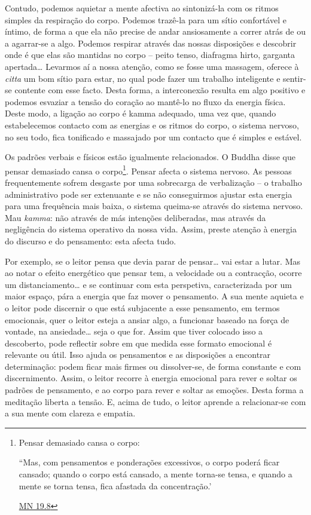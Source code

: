 Contudo, podemos aquietar a mente afectiva ao sintonizá-la com os ritmos simples da respiração do corpo. Podemos trazê-la para um sítio confortável e íntimo, de forma a que ela não precise de andar ansiosamente a correr atrás de ou a agarrar-se a algo. Podemos respirar através das nossas disposições e descobrir onde é que elas são mantidas no corpo -- peito tenso, diafragma hirto, garganta apertada\ldots{} Levarmos aí a nossa atenção, como se fosse uma massagem, oferece à \emph{citta} um bom sítio para estar, no qual pode fazer um trabalho inteligente e sentir-se contente com esse facto. Desta forma, a interconexão resulta em algo positivo e podemos esvaziar a tensão do coração ao mantê-lo no fluxo da energia física. Deste modo, a ligação ao corpo é kamma adequado, uma vez que, quando estabelecemos contacto com as energias e os ritmos do corpo, o sistema nervoso, no seu todo, fica tonificado e massajado por um contacto que é simples e estável.

Os padrões verbais e físicos estão igualmente relacionados. O Buddha disse que pensar demasiado cansa o corpo\footnote{Pensar demasiado cansa o corpo:

  ``Mas, com pensamentos e ponderações excessivos, o corpo poderá ficar cansado; quando o corpo está cansado, a mente torna-se tensa, e quando a mente se torna tensa, fica afastada da concentração.'

  \href{https://suttacentral.net/mn19/en/bodhi}{MN 19.8}}. Pensar afecta o sistema nervoso. As pessoas frequentemente sofrem desgaste por uma sobrecarga de verbalização -- o trabalho administrativo pode ser extenuante e se não conseguirmos ajustar esta energia para uma frequência mais baixa, o sistema queima-se através do sistema nervoso. Mau \emph{kamma}: não através de más intenções deliberadas, mas através da negligência do sistema operativo da nossa vida. Assim, preste atenção à energia do discurso e do pensamento: esta afecta tudo.

Por exemplo, se o leitor pensa que devia parar de pensar\ldots{} vai estar a lutar. Mas ao notar o efeito energético que pensar tem, a velocidade ou a contracção, ocorre um distanciamento\ldots{} e se continuar com esta perspetiva, caracterizada por um maior espaço, pára a energia que faz mover o pensamento. A sua mente aquieta e o leitor pode discernir o que está subjacente a esse pensamento, em termos emocionais, quer o leitor esteja a ansiar algo, a funcionar baseado na força de vontade, na ansiedade\ldots{} seja o que for. Assim que tiver colocado isso a descoberto, pode reflectir sobre em que medida esse formato emocional é relevante ou útil. Isso ajuda os pensamentos e as disposições a encontrar determinação: podem ficar mais firmes ou dissolver-se, de forma constante e com discernimento. Assim, o leitor recorre à energia emocional para rever e soltar os padrões de pensamento, e ao corpo para rever e soltar as emoções. Desta forma a meditação liberta a tensão. E, acima de tudo, o leitor aprende a relacionar-se com a sua mente com clareza e empatia.

